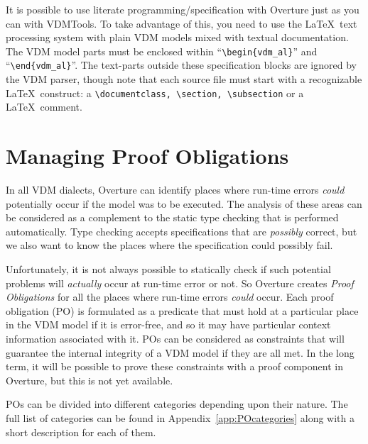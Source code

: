 \documentclass{overturerepchap}
\begin{document}
It is possible to use literate programming/specification \cite{Johnson96} with
Overture just as you can with VDMTools. To take advantage of this,
you need to use the \LaTeX\ text processing system with
plain VDM models mixed with textual documentation.  The VDM model parts must be
enclosed within ``\verb+\begin{vdm_al}+'' and ``\verb+\end{vdm_al}+''. The
text-parts outside these specification blocks are ignored by the VDM parser,
though note that each source file must start with a recognizable \LaTeX\
construct: a \verb+\documentclass, \section, \subsection+ or a \LaTeX\ comment.


\chapter{Managing Proof Obligations}\label{sec:POmanagement}

In all VDM dialects, Overture can identify places where run-time errors
\emph{could} potentially occur if the model was to be executed. The analysis of
these areas can be considered
as a complement to the static type checking that is performed automatically.
Type checking accepts specifications that are \emph{possibly} correct, but
we also want to know the places where the specification could possibly fail.

Unfortunately, it is not always possible to statically check if such
potential problems will \emph{actually} occur at run-time error or not. So Overture
creates \emph{Proof Obligations}\index{proof obligation} for all the places
where run-time errors \emph{could} occur. Each proof obligation (PO)
is formulated as a predicate that must hold at a particular place in the VDM
model if it is error-free, and so it may have particular context information
associated with it. POs can be considered as
constraints that will guarantee the internal integrity of a VDM model if they
are all met. In the long term, it will be possible to prove these constraints
with a proof component in Overture, but this is not yet available.

POs can be divided into different categories
depending upon their nature. The full list of categories can be found in
Appendix~\ref{app:POcategories} along with a short description for
each of them.
\end{document}
